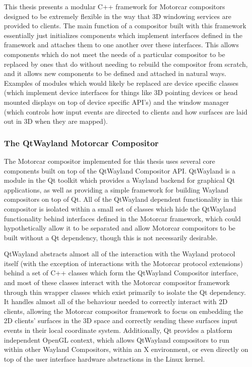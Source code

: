 This thesis presents a modular C++ framework for Motorcar compositors designed to be extremely flexible in the way that 3D windowing services are provided to clients. The main function of a compositor built with this framework essentially just initializes components which implement interfaces defined in the framework and attaches them to one another over these interfaces. This allows components which do not meet the needs of a particular compositor to be replaced by ones that do without needing to rebuild the compositor from scratch, and it allows new components to be defined and attached in natural ways. Examples of modules which would likely be replaced are device specific classes (which implement device interfaces for things like 3D pointing devices or head mounted displays on top of device specific API's) and the window manager (which controls how input events are directed to clients and how surfaces are laid out in 3D when they are mapped).

\subsubsection{The QtWayland Motorcar Compositor}

The Motorcar compositor implemented for this thesis uses several core components built on top of the QtWayland Compositor API. QtWayland is a module in the Qt toolkit which provides a Wayland backend for graphical Qt applications, as well as providing a simple framework for building Wayland compositors on top of Qt. All of the QtWayland dependent functionality in this compositor is isolated within a small set of classes which hide the QtWayland functionality behind interfaces defined in the Motorcar framework, which could hypothetically allow it to be separated and allow Motorcar compositors to be built without a Qt dependency, though this is not necessarily desirable.  

QtWayland abstracts almost all of the interaction with the Wayland protocol itself (with the exception of interactions with the Motorcar protocol extensions) behind a set of C++ classes which form the QtWayland Compositor interface, and most of these classes interact with the Motorcar compositor framework through thin wrapper classes which exist primarily to isolate the Qt dependency. It handles almost all of the behaviour needed to correctly interact with 2D clients, allowing the Motorcar compositor framework to focus on embedding the 2D clients' surfaces in the 3D space and correctly sending these surfaces input events in their local coordinate system. Additionally, Qt provides a platform independent OpenGL context, which allows QtWayland compositors to run within other Wayland Compositors, within an X environment, or even directly on top of the user interface hardware abstractions in the Linux kernel.

